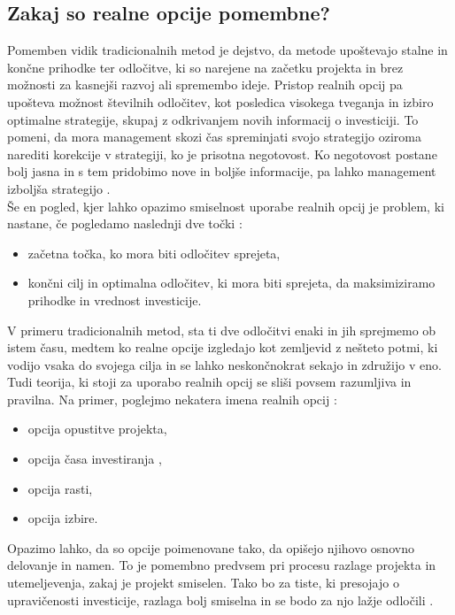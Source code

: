 \documentclass[12pt, a4paper]{amsart}
\theoremstyle{definition} %
\theoremstyle{plain} %
\begin{document}
\subsection{Zakaj so realne opcije pomembne?}
Pomemben vidik tradicionalnih metod je dejstvo, da metode upoštevajo stalne in končne prihodke ter odločitve, ki so narejene na začetku projekta in brez možnosti za kasnejši razvoj ali spremembo ideje. Pristop realnih opcij pa upošteva možnost številnih odločitev, kot posledica visokega tveganja in izbiro optimalne strategije, skupaj z odkrivanjem novih informacij o investiciji. To pomeni, da mora management skozi čas spreminjati svojo strategijo oziroma narediti korekcije v strategiji, ko je prisotna negotovost. Ko negotovost postane bolj jasna in s tem pridobimo nove in boljše informacije, pa lahko management izboljša strategijo \cite[str. 92]{Mun}. \\

Še en pogled, kjer lahko opazimo smiselnost uporabe realnih opcij je problem, ki nastane, če pogledamo naslednji dve točki \cite[str. 92]{Mun}:
\begin{itemize}
\item začetna točka, ko mora biti odločitev sprejeta,
\item končni cilj in optimalna odločitev, ki mora biti sprejeta, da maksimiziramo prihodke in vrednost investicije.
\end{itemize}
V primeru tradicionalnih metod, sta ti dve odločitvi enaki in jih sprejmemo ob istem času, medtem ko realne opcije izgledajo kot zemljevid z nešteto potmi, ki vodijo vsaka do svojega cilja in se lahko neskončnokrat sekajo in združijo v eno. \\

Tudi teorija, ki stoji za uporabo realnih opcij se sliši povsem razumljiva in pravilna. Na primer, poglejmo nekatera imena realnih opcij \cite[str. 93]{Mun}:
\begin{itemize}
\item opcija opustitve projekta,
\item opcija časa investiranja ,
\item opcija rasti,
\item opcija izbire.
\end{itemize}
Opazimo lahko, da so opcije poimenovane tako, da opišejo njihovo osnovno delovanje in namen. To je pomembno predvsem pri procesu razlage projekta in utemeljevenja, zakaj je projekt smiselen. Tako bo za tiste, ki presojajo o upravičenosti investicije, razlaga bolj smiselna in se bodo za njo lažje odločili \cite[str. 93]{Mun}. \\
\end{document}
